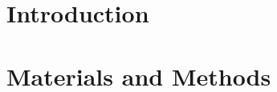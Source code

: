 \documentclass[orange]{enslyonstage}
\begin{document}

\fairepagedegarde

\faireabstract


\section{Introduction}
\label{sec:intro}
%

\paragraph{}



\section{Materials and Methods}
\label{sec:methods}
%

\paragraph{}


\end{document}
